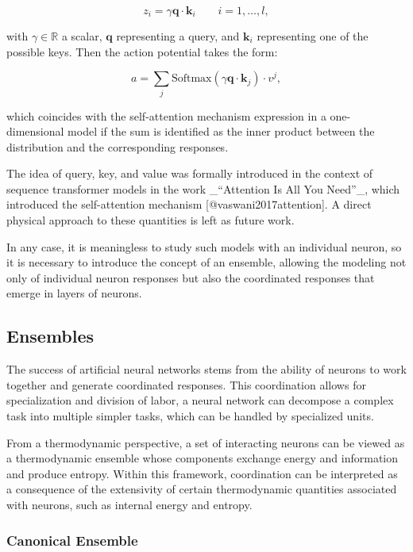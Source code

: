 \documentclass[12pt]{article}
\begin{document}
\begin{equation}
z_i = \gamma \mathbf{q} \cdot \mathbf{k}_i \qquad i = 1, \dots, l,
\end{equation}

with $\gamma \in \mathbb{R}$ a scalar, $\mathbf{q}$ representing a query, and $\mathbf{k}_i$ representing one of the possible keys. Then the action potential takes the form:

\begin{equation}
a = \sum_j \text{Softmax}(\gamma \mathbf{q} \cdot \mathbf{k}_j) \cdot v^j,
\end{equation}

which coincides with the self-attention mechanism expression in a one-dimensional model if the sum is identified as the inner product between the distribution and the corresponding responses.

The idea of query, key, and value was formally introduced in the context of sequence transformer models in the work _“Attention Is All You Need”_, which introduced the self-attention mechanism [@vaswani2017attention]. A direct physical approach to these quantities is left as future work.

In any case, it is meaningless to study such models with an individual neuron, so it is necessary to introduce the concept of an ensemble, allowing the modeling not only of individual neuron responses but also the coordinated responses that emerge in layers of neurons.

\subsection{Ensembles}

The success of artificial neural networks stems from the ability of neurons to work together and generate coordinated responses. This coordination allows for specialization and division of labor, a neural network can decompose a complex task into multiple simpler tasks, which can be handled by specialized units.

From a thermodynamic perspective, a set of interacting neurons can be viewed as a thermodynamic ensemble whose components exchange energy and information and produce entropy. Within this framework, coordination can be interpreted as a consequence of the extensivity of certain thermodynamic quantities associated with neurons, such as internal energy and entropy.

\subsubsection{Canonical Ensemble}
\end{document}
